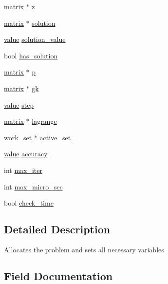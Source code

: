 \begin{DoxyCompactItemize}
\item 
\hyperlink{structmatrix}{matrix} $\ast$ \hyperlink{structproblem_a840058b5c67561185c94da497d0d3da6}{z}
\item 
\hyperlink{structmatrix}{matrix} $\ast$ \hyperlink{structproblem_a70626c7db657c601438f867391005721}{solution}
\item 
\hyperlink{mat_lib_8h_a24f54d55d636a8405ad2cf062c3c9bee}{value} \hyperlink{structproblem_a6fcb6ec86b1ba65bd2a34e9a9731c452}{solution\+\_\+value}
\item 
bool \hyperlink{structproblem_af593a3f5fcf12e8513374bc6475a53d4}{has\+\_\+solution}
\item 
\hyperlink{structmatrix}{matrix} $\ast$ \hyperlink{structproblem_a0b8e7c785036ef0cb64a801257094918}{p}
\item 
\hyperlink{structmatrix}{matrix} $\ast$ \hyperlink{structproblem_abfbecabeb3ffaa60557898d366c79c35}{gk}
\item 
\hyperlink{mat_lib_8h_a24f54d55d636a8405ad2cf062c3c9bee}{value} \hyperlink{structproblem_a9c398bc1d126ef3a4cf1efdc9d9f7423}{step}
\item 
\hyperlink{structmatrix}{matrix} $\ast$ \hyperlink{structproblem_a988084bf1423637718de8882244149f4}{lagrange}
\item 
\hyperlink{structwork__set}{work\+\_\+set} $\ast$ \hyperlink{structproblem_a27b8b36dc36cb3620e52c6275d0bb87b}{active\+\_\+set}
\item 
\hyperlink{mat_lib_8h_a24f54d55d636a8405ad2cf062c3c9bee}{value} \hyperlink{structproblem_abb02aa4aa436e037d8c806b2364cf97c}{accuracy}
\item 
int \hyperlink{structproblem_a53380b3b14c20bdfcb3bc9970c421231}{max\+\_\+iter}
\item 
int \hyperlink{structproblem_af471c126183533a7a418a166768af42d}{max\+\_\+micro\+\_\+sec}
\item 
bool \hyperlink{structproblem_afb90fd1d52b36f4f03af3b09f7679bd8}{check\+\_\+time}
\end{DoxyCompactItemize}


\subsection{Detailed Description}
Allocates the problem and sets all necessary variables 

\subsection{Field Documentation}
\hypertarget{structproblem_ac56453eb618f2ce98f20d91442a5690b}{}
